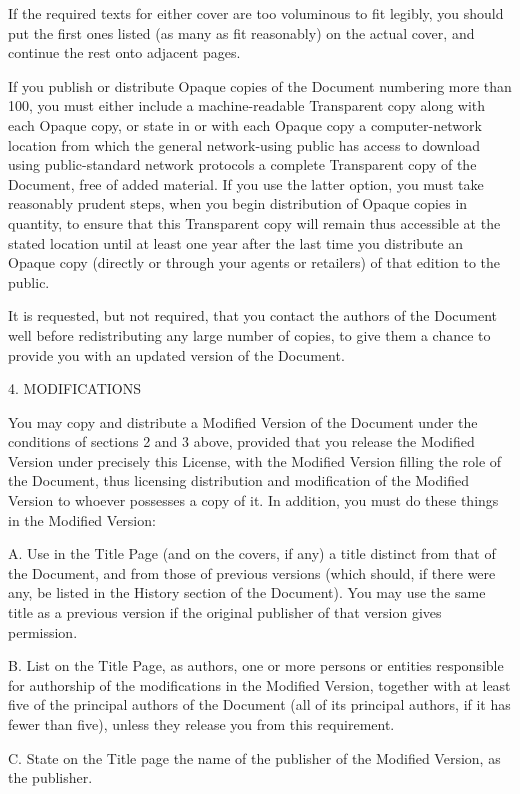 \documentclass[a4paper,11pt]{report}
\begin{document}
{ If the required texts for either cover are too voluminous to fit legibly, you
should put the first ones listed (as many as fit reasonably) on the actual
cover, and continue the rest onto adjacent pages. 

 If you publish or distribute Opaque copies of the Document numbering more than
100, you must either include a machine-readable Transparent copy along with
each Opaque copy, or state in or with each Opaque copy a computer-network
location from which the general network-using public has access to download
using public-standard network protocols a complete Transparent copy of the
Document, free of added material. If you use the latter option, you must take
reasonably prudent steps, when you begin distribution of Opaque copies in
quantity, to ensure that this Transparent copy will remain thus accessible at
the stated location until at least one year after the last time you distribute
an Opaque copy (directly or through your agents or retailers) of that edition
to the public. 

 It is requested, but not required, that you contact the authors of the
Document well before redistributing any large number of copies, to give them a
chance to provide you with an updated version of the Document. 

 4. MODIFICATIONS 

 You may copy and distribute a Modified Version of the Document under the
conditions of sections 2 and 3 above, provided that you release the Modified
Version under precisely this License, with the Modified Version filling the
role of the Document, thus licensing distribution and modification of the
Modified Version to whoever possesses a copy of it. In addition, you must do
these things in the Modified Version: 

 A. Use in the Title Page (and on the covers, if any) a title distinct from
that of the Document, and from those of previous versions (which should, if
there were any, be listed in the History section of the Document). You may use
the same title as a previous version if the original publisher of that version
gives permission. 

 B. List on the Title Page, as authors, one or more persons or entities
responsible for authorship of the modifications in the Modified Version,
together with at least five of the principal authors of the Document (all of
its principal authors, if it has fewer than five), unless they release you
from this requirement. 

 C. State on the Title page the name of the publisher of the Modified Version,
as the publisher. 

}
\end{document}
